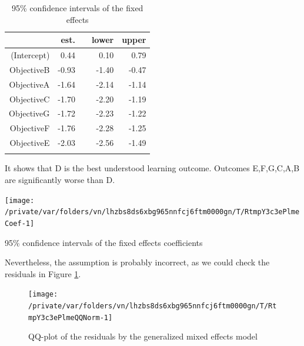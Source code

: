 \documentclass[12pt,english,nohyper]{tufte-handout}\usepackage[]{graphicx}\usepackage[]{color}
\newenvironment{knitrout}{}{} %
\begin{document}
\begin{longtable}{rrlrr}
  \hline
 & est. &    & lower & upper \\ 
  \hline
(Intercept) & 0.44 &  & 0.10 & 0.79 \\ 
  ObjectiveB & -0.93 &  & -1.40 & -0.47 \\ 
  ObjectiveA & -1.64 &  & -2.14 & -1.14 \\ 
  ObjectiveC & -1.70 &  & -2.20 & -1.19 \\ 
  ObjectiveG & -1.72 &  & -2.23 & -1.22 \\ 
  ObjectiveF & -1.76 &  & -2.28 & -1.25 \\ 
  ObjectiveE & -2.03 &  & -2.56 & -1.49 \\ 
   \hline
\hline
\caption{95\% confidence intervals of the fixed effects} 
\label{tab:lme_fixed}
\end{longtable}


It shows that D is the best understood learning outcome.
Outcomes E,F,G,C,A,B are
significantly worse than D.



\begin{knitrout}
\color{fgcolor}\begin{marginfigure}
\texttt{[image: /private/var/folders/vn/lhzbs8ds6xbg965nnfcj6ftm0000gn/T/RtmpY3c3ePlmeCoef-1]} \caption[95\% confidence intervals of the fixed effects coefficients]{95\% confidence intervals of the fixed effects coefficients}\label{mar:lmeCoef}
\end{marginfigure}


\end{knitrout}

Nevertheless, the assumption is probably incorrect, as we could check the residuals in
Figure \ref{fig:lmeQQNorm}.

\begin{knitrout}
\color{fgcolor}\begin{figure}

{\centering \texttt{[image: /private/var/folders/vn/lhzbs8ds6xbg965nnfcj6ftm0000gn/T/RtmpY3c3ePlmeQQNorm-1]} 

}

\caption[QQ-plot of the residuals by the generalized mixed effects model]{QQ-plot of the residuals by the generalized mixed effects model}\label{fig:lmeQQNorm}
\end{figure}


\end{knitrout}
\end{document}
